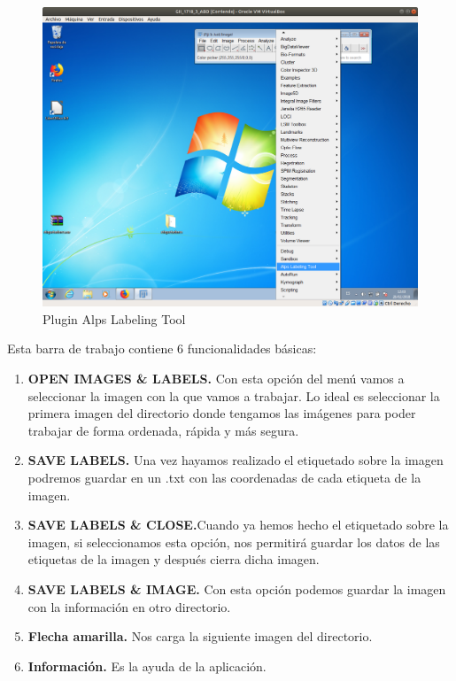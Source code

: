 \begin{itemize}
	\begin{figure}
		\centering
		\includegraphics[width=0.7\linewidth]{img/AlpsLTPlugin}
		\caption{Plugin Alps Labeling Tool}
		\label{fig:alpsltplugin}
	\end{figure}
	Esta barra de trabajo contiene 6 funcionalidades básicas:
	\begin{enumerate}
		\item \textbf{OPEN IMAGES \& LABELS.} Con esta opción del menú vamos a seleccionar la imagen con la que vamos a trabajar. Lo ideal es seleccionar la primera imagen del directorio donde tengamos las imágenes para poder trabajar de forma ordenada, rápida y más segura.
		\item \textbf{SAVE LABELS.} Una vez hayamos realizado el etiquetado sobre la imagen podremos guardar en un .txt con las coordenadas de cada etiqueta de la imagen.
		\item \textbf{SAVE LABELS \& CLOSE.}Cuando ya hemos hecho el etiquetado sobre la imagen, si seleccionamos esta opción, nos permitirá guardar los datos de las etiquetas de la imagen y después cierra dicha imagen.
		\item \textbf{SAVE LABELS \& IMAGE.} Con esta opción podemos guardar la imagen con la información en otro directorio.
		\item \textbf{Flecha amarilla.} Nos carga la siguiente imagen del directorio.
		\item \textbf{Información.} Es la ayuda de la aplicación.
		
	\end{enumerate}
	

\end{itemize}
